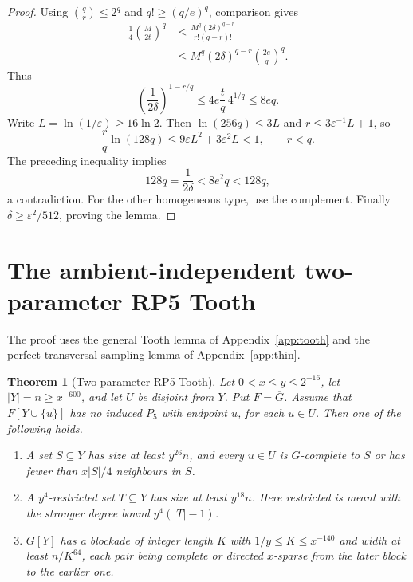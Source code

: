 \documentclass[11pt,a4paper]{article}
\newtheorem{theorem}{Theorem}[section]
\theoremstyle{definition}
\theoremstyle{remark}
\numberwithin{equation}{section}
\begin{document}
\begin{proof}
Using \(\binom qr\le2^q\) and \(q!\ge(q/e)^q\), comparison gives
\begin{align*}
 \frac14\left(\frac M{2t}\right)^q
 &\le\frac{M^q(2\delta)^{q-r}}{r!(q-r)!}\\
 &\le M^q(2\delta)^{q-r}\left(\frac{2e}q\right)^q.
\end{align*}
Thus
\[
 \left(\frac1{2\delta}\right)^{1-r/q}
 \le4e\frac tq\,4^{1/q}\le8eq.
\]
Write \(L=\ln(1/\varepsilon)\ge16\ln2\). Then \(\ln(256q)\le3L\) and \(r\le3\varepsilon^{-1}L+1\), so
\[
 \frac rq\ln(128q)\le9\varepsilon L^2+3\varepsilon^2L<1,
 \qquad r<q.
\]
The preceding inequality implies
\[
 128q=\frac1{2\delta}<8e^2q<128q,
\]
a contradiction. For the other homogeneous type, use the complement. Finally \(\delta\ge\varepsilon^2/512\), proving the lemma.
\end{proof}


\section{The ambient-independent two-parameter RP5 Tooth}\label{app:rp5}

The proof uses the general Tooth lemma of Appendix~\ref{app:tooth} and the perfect-transversal sampling lemma of Appendix~\ref{app:thin}.

\begin{theorem}[Two-parameter RP5 Tooth]\label{thm:rp5}
Let \(0<x\le y\le 2^{-16}\), let \(|Y|=n\ge x^{-600}\), and let \(U\) be disjoint from \(Y\). Put \(F=\overline{G}\). Assume that \(F[Y\cup\{u\}]\) has no induced \(P_{5}\) with endpoint \(u\), for each \(u\in U\). Then one of the following holds.
\begin{enumerate}[label=(\Alph*)]
\item A set \(S \subseteq Y\) has size at least \(y^{26} n\), and every \(u\in U\) is \(G\)-complete to \(S\) or has fewer than \(x|S|/4\) neighbours in \(S\).
\item A \(y^{4}\)-restricted set \(T \subseteq Y\) has size at least \(y^{18} n\). Here restricted is meant with the stronger degree bound \(y^{4}(|T|-1)\).
\item \(G[Y]\) has a blockade of integer length \(K\) with \(1/y\le K\le x^{-140}\) and width at least \(n/K^{64}\), each pair being complete or directed \(x\)-sparse from the later block to the earlier one.
\end{enumerate}


\end{theorem}
\end{document}
